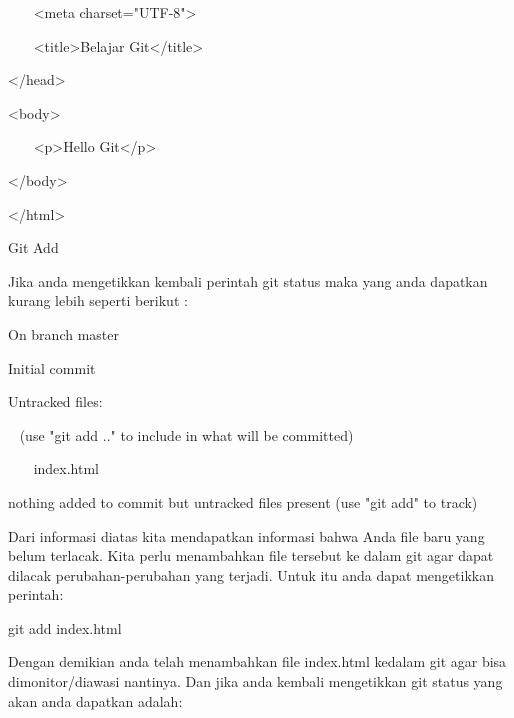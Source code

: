 \noindent 
 \hspace*{0.5in} ~~~ <meta charset="UTF-8"> \par
\noindent 
 \hspace*{0.5in} ~~~ <title>Belajar Git</title> \par
\noindent 
 \hspace*{0.5in} </head> \par
\noindent 
 \hspace*{0.5in} <body> \par
\noindent 
 \hspace*{0.5in} ~~~ <p>Hello Git</p> \par
\noindent 
 \hspace*{0.5in} </body> \par
\noindent 
 \hspace*{0.5in} </html> \par
\vspace{12pt}
\noindent 
 \hspace*{0.5in} Git Add \par
\noindent 
Jika anda mengetikkan kembali perintah git status maka yang anda dapatkan kurang lebih seperti berikut : \par
\noindent 
On branch master~~~  \par
\noindent 
Initial commit \par
\noindent 
Untracked files: \par
\noindent 
~  \hspace*{0.5in} (use "git add .." to include in what will be committed) \par
\noindent 
~~~  \hspace*{0.5in} index.html \par
\noindent 
 \hspace*{0.5in} nothing added to commit but untracked files present (use "git add" to track) \par
\noindent 
Dari informasi diatas kita mendapatkan informasi bahwa Anda file baru yang belum terlacak. Kita perlu menambahkan file tersebut ke dalam git agar dapat dilacak perubahan-perubahan yang terjadi. Untuk itu anda dapat mengetikkan perintah: \par
\noindent 
 \hspace*{0.5in} git add index.html \par
\noindent 
Dengan demikian anda telah menambahkan file index.html kedalam git agar bisa dimonitor/diawasi nantinya. Dan jika anda kembali mengetikkan git status yang akan anda dapatkan adalah: \par
